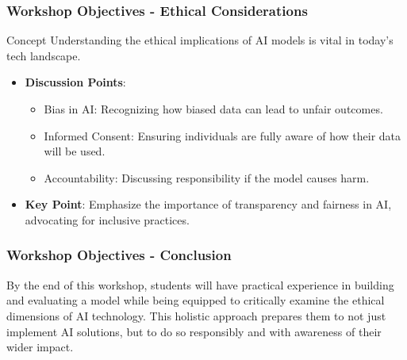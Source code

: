 \documentclass{beamer}
\begin{document}
\begin{frame}[fragile]
    \frametitle{Workshop Objectives - Ethical Considerations}
    \begin{block}{Concept}
        Understanding the ethical implications of AI models is vital in today’s tech landscape.
    \end{block}
    \begin{itemize}
        \item \textbf{Discussion Points}:
            \begin{itemize}
                \item Bias in AI: Recognizing how biased data can lead to unfair outcomes.
                \item Informed Consent: Ensuring individuals are fully aware of how their data will be used.
                \item Accountability: Discussing responsibility if the model causes harm.
            \end{itemize}
        \item \textbf{Key Point}: Emphasize the importance of transparency and fairness in AI, advocating for inclusive practices.
    \end{itemize}
\end{frame}

\begin{frame}[fragile]
    \frametitle{Workshop Objectives - Conclusion}
    By the end of this workshop, students will have practical experience in building and evaluating a model while being equipped to critically examine the ethical dimensions of AI technology. This holistic approach prepares them to not just implement AI solutions, but to do so responsibly and with awareness of their wider impact.
\end{frame}
\end{document}
